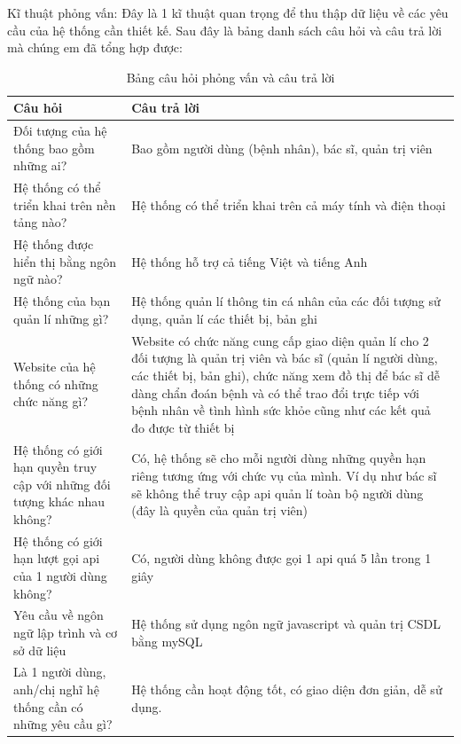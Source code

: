 Kĩ thuật phỏng vấn: Đây là 1 kĩ thuật quan trọng để thu thập dữ liệu về các yêu cầu của hệ thống cần thiết kế. Sau đây là bảng danh sách câu hỏi và câu trả lời mà chúng em đã tổng hợp được:
\begin{table}[H]
    \centering
    \caption{Bảng câu hỏi phỏng vấn và câu trả lời}
    \begin{tabularx}{0.9\textwidth}{
    | >{\raggedright\arraybackslash}X
    | >{\raggedright\arraybackslash}X|
    }
    \hline
    \bfseries Câu hỏi                              &   \bfseries Câu trả lời \\\hline
    Đối tượng của hệ thống bao gồm những ai?       &   Bao gồm người dùng (bệnh nhân), bác sĩ, quản trị viên \\\hline
    Hệ thống có thể triển khai trên nền tảng nào?  &   Hệ thống có thể triển khai trên cả máy tính và điện thoại \\\hline
    Hệ thống được hiển thị bằng ngôn ngữ nào?      &   Hệ thống hỗ trợ cả tiếng Việt và tiếng Anh\\\hline
    Hệ thống của bạn quản lí những gì?             &   Hệ thống quản lí thông tin cá nhân của các đối tượng sử dụng, quản lí các thiết bị, bản ghi \\\hline
    Website của hệ thống có những chức năng gì?    &   Website có chức năng cung cấp giao diện quản lí cho 2 đối tượng là quản trị viên và bác sĩ (quản lí người dùng, các thiết bị, bản ghi), chức năng xem đồ thị để bác sĩ dễ dàng chẩn đoán bệnh và có thể trao đổi trực tiếp với bệnh nhân về tình hình sức khỏe cũng như các kết quả đo được từ thiết bị \\\hline
    Hệ thống có giới hạn quyền truy cập với những đối tượng khác nhau không?   &  Có, hệ thống sẽ cho mỗi người dùng những quyền hạn riêng tương ứng với chức vụ của mình. Ví dụ như bác sĩ sẽ không thể truy cập api quản lí toàn bộ người dùng (đây là quyền của quản trị viên) \\\hline
    Hệ thống có giới hạn lượt gọi api của 1 người dùng không?                  &  Có, người dùng không được gọi 1 api quá 5 lần trong 1 giây \\\hline
    Yêu cầu về ngôn ngữ lập trình và cơ sở dữ liệu &   Hệ thống sử dụng ngôn ngữ javascript và quản trị CSDL bằng mySQL \\\hline
    Là 1 người dùng, anh/chị nghĩ hệ thống cần có những yêu cầu gì?            &  Hệ thống cần hoạt động tốt, có giao diện đơn giản, dễ sử dụng. \\\hline
    \end{tabularx}
\end{table}

